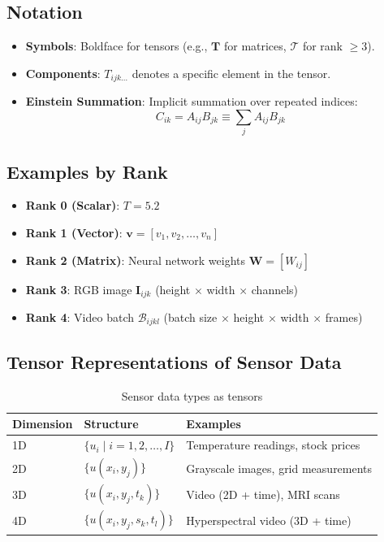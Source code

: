 \documentclass[12pt]{article}
\begin{document}
\subsection*{Notation}
\begin{itemize}
    \item \textbf{Symbols}: Boldface for tensors (e.g., $\bm{T}$ for matrices, $\mathcal{T}$ for rank $\geq 3$).
    \item \textbf{Components}: $T_{ijk\dots}$ denotes a specific element in the tensor.
    \item \textbf{Einstein Summation}: Implicit summation over repeated indices:
    \[
    C_{ik} = A_{ij} B_{jk} \equiv \sum_j A_{ij} B_{jk}
    \]
\end{itemize}

\subsection*{Examples by Rank}
\begin{itemize}
    \item \textbf{Rank 0 (Scalar)}: $T = 5.2$ 
    \item \textbf{Rank 1 (Vector)}: $\bm{v} = [v_1, v_2, \dots, v_n]$
    \item \textbf{Rank 2 (Matrix)}: Neural network weights $\bm{W} = [W_{ij}]$
    \item \textbf{Rank 3}: RGB image $\bm{I}_{ijk}$ (height $\times$ width $\times$ channels)
    \item \textbf{Rank 4}: Video batch $\mathcal{B}_{ijkl}$ (batch size $\times$ height $\times$ width $\times$ frames)
\end{itemize}

\subsection*{Tensor Representations of Sensor Data}
\begin{table}[ht]
\centering
\caption{Sensor data types as tensors}
\label{tab:sensor_data}
\begin{tabular}{|l|l|l|}
\hline
\textbf{Dimension} & \textbf{Structure} & \textbf{Examples} \\ \hline
1D & $\{ u_i \mid i = 1, 2, \dots, I \}$ & Temperature readings, stock prices \\ \hline
2D & $\{ u(x_i, y_j) \}$ & Grayscale images, grid measurements \\ \hline
3D & $\{ u(x_i, y_j, t_k) \}$ & Video (2D + time), MRI scans \\ \hline
4D & $\{ u(x_i, y_j, s_k, t_l) \}$ & Hyperspectral video (3D + time) \\ \hline
\end{tabular}
\end{table}
\end{document}
